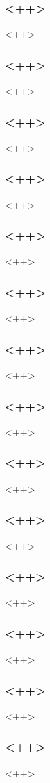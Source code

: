 \begin{frame}[fragile] %
\frametitle{<++>}
<++>
\end{frame}

\begin{frame}[fragile] %
\frametitle{<++>}
<++>
\end{frame}

\begin{frame}[fragile] %
\frametitle{<++>}
<++>
\end{frame}

\begin{frame}[fragile] %
\frametitle{<++>}
<++>
\end{frame}

\begin{frame}[fragile] %
\frametitle{<++>}
<++>
\end{frame}

\begin{frame}[fragile] %
\frametitle{<++>}
<++>
\end{frame}

\begin{frame}[fragile] %
\frametitle{<++>}
<++>
\end{frame}

\begin{frame}[fragile] %
\frametitle{<++>}
<++>
\end{frame}

\begin{frame}[fragile] %
\frametitle{<++>}
<++>
\end{frame}

\begin{frame}[fragile] %
\frametitle{<++>}
<++>
\end{frame}

\begin{frame}[fragile] %
\frametitle{<++>}
<++>
\end{frame}

\begin{frame}[fragile] %
\frametitle{<++>}
<++>
\end{frame}

\begin{frame}[fragile] %
\frametitle{<++>}
<++>
\end{frame}

\begin{frame}[fragile] %
\frametitle{<++>}
<++>
\end{frame}

